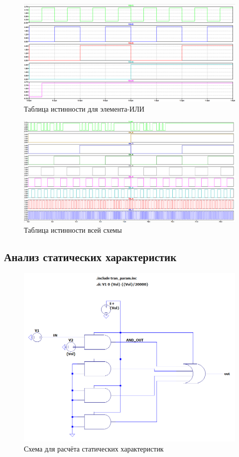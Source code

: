 \documentclass[a4paper,14pt]{article}
\begin{document}
\begin{figure}[H]
	\centering		
	\includegraphics[width=\linewidth]{image/spice_or_bin}
	\caption{Таблица истинности для элемента-ИЛИ }\label{img:spice_or_bin}
\end{figure}

\begin{figure}[H]
	\centering		
	\includegraphics[width=\linewidth]{image/spice_bin}
	\caption{Таблица истинности всей схемы}\label{img:spice_bin}
\end{figure}

\subsection{Анализ статических характеристик}

\begin{figure}[H]
	\centering		
	\includegraphics[width=\linewidth]{image/dc_schema}
	\caption{Схема для расчёта статических характеристик}\label{img:dc_schema}
\end{figure}
\end{document}
